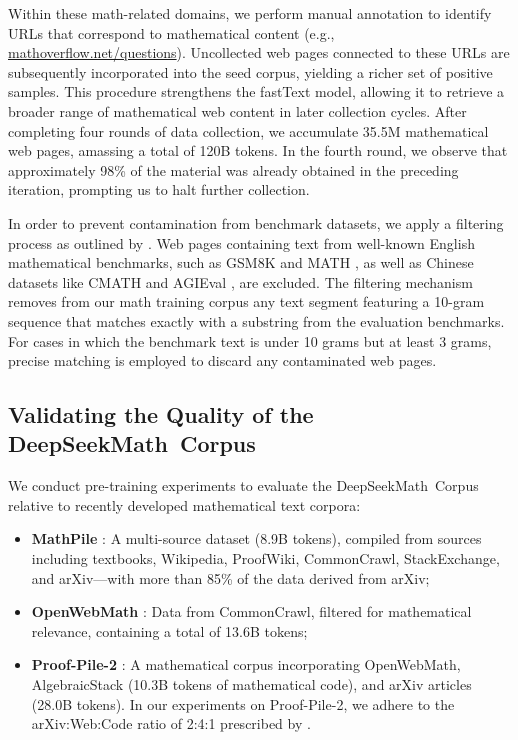 Within these math-related domains, we perform manual annotation to identify URLs that correspond to mathematical content (e.g., \url{mathoverflow.net/questions}). Uncollected web pages connected to these URLs are subsequently incorporated into the seed corpus, yielding a richer set of positive samples. This procedure strengthens the fastText model, allowing it to retrieve a broader range of mathematical web content in later collection cycles. After completing four rounds of data collection, we accumulate 35.5M mathematical web pages, amassing a total of 120B tokens. In the fourth round, we observe that approximately 98\% of the material was already obtained in the preceding iteration, prompting us to halt further collection.

In order to prevent contamination from benchmark datasets, we apply a filtering process as outlined by \cite{deepseek-coder}. Web pages containing text from well-known English mathematical benchmarks, such as GSM8K \citep{gsm8k} and MATH \citep{MATH}, as well as Chinese datasets like CMATH \citep{wei2023cmath} and AGIEval \citep{agieval}, are excluded. The filtering mechanism removes from our math training corpus any text segment featuring a 10-gram sequence that matches exactly with a substring from the evaluation benchmarks. For cases in which the benchmark text is under 10 grams but at least 3 grams, precise matching is employed to discard any contaminated web pages.

\subsection{Validating the Quality of the DeepSeekMath~Corpus}

We conduct pre-training experiments to evaluate the DeepSeekMath~Corpus relative to recently developed mathematical text corpora:

\begin{itemize}[topsep=0pt]
    \item \textbf{MathPile} \citep{mathpile}: A multi-source dataset (8.9B tokens), compiled from sources including textbooks, Wikipedia, ProofWiki, CommonCrawl, StackExchange, and arXiv—with more than 85\% of the data derived from arXiv;
    \item \textbf{OpenWebMath} \citep{openwebmath}: Data from CommonCrawl, filtered for mathematical relevance, containing a total of 13.6B tokens;
    \item \textbf{Proof-Pile-2} \citep{llemma}: A mathematical corpus incorporating OpenWebMath, AlgebraicStack (10.3B tokens of mathematical code), and arXiv articles (28.0B tokens). In our experiments on Proof-Pile-2, we adhere to the arXiv:Web:Code ratio of 2:4:1 prescribed by \cite{llemma}.
\end{itemize}

